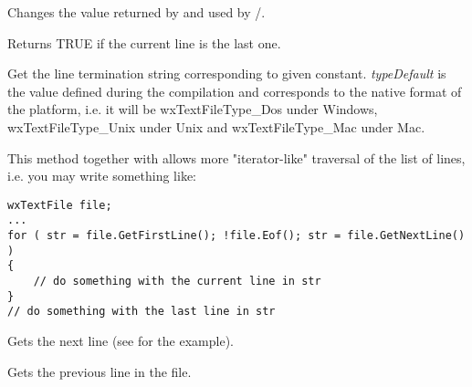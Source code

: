 \label{wxtextfilegotoline}


Changes the value returned by  
and used by /.

\label{wxtextfileeof}


Returns TRUE if the current line is the last one.

\label{wxtextfilegeteol}


Get the line termination string corresponding to given constant. {\it typeDefault} is
the value defined during the compilation and corresponds to the native format of the
platform, i.e. it will be wxTextFileType\_Dos under Windows, wxTextFileType\_Unix under
Unix and wxTextFileType\_Mac under Mac.

\label{wxtextfilegetfirstline}


This method together with  
allows more "iterator-like" traversal of the list of lines, i.e. you may
write something like:

\begin{verbatim}
wxTextFile file;
...
for ( str = file.GetFirstLine(); !file.Eof(); str = file.GetNextLine() )
{
    // do something with the current line in str
}
// do something with the last line in str
\end{verbatim}

\label{wxtextfilegetnextline}


Gets the next line (see  for 
the example).

\label{wxtextfilegetprevline}


Gets the previous line in the file.

\label{wxtextfilegetlastline}

